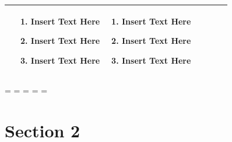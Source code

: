 \documentclass [10pt]{article}
\begin{document}
\begin{longtable}{| p{ } | p{ } | p{ } |p{ } | p{ } | p{ } | p{ }| }
&
\begin{minipage}{\columnwidth}
\vspace{2mm}
\begin{enumerate}
\item Insert Text Here
\item Insert Text Here
\item Insert Text Here
\end{enumerate}
\end{minipage}
& 

\begin{minipage}{\columnwidth}
\vspace{2mm}
\begin{enumerate}
\item Insert Text Here
\item Insert Text Here
\item Insert Text Here
\end{enumerate}
\end{minipage}\\ \hline 




\end{longtable}
\endgroup




\endgroup


\newpage


\paperwidth=\pdfpageheight
\paperheight=\pdfpagewidth
\pdfpageheight=\paperheight
\pdfpagewidth=\paperwidth
\headwidth=\textwidth


\section{Section 2}

\begin{landscape}
\lipsum[3]
\end{landscape}
\end{document}
